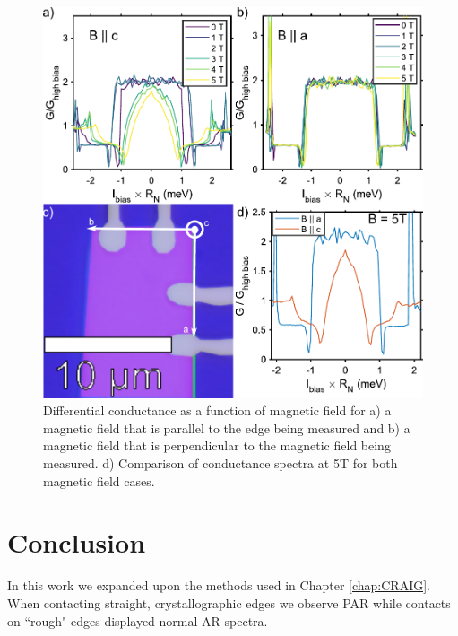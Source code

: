 \begin{figure}[h]
    \centering
    \includegraphics[width = \textwidth]{Chap4/Figures/MagneticField.pdf}
    \caption{Differential conductance as a function of magnetic field for a) a magnetic field that is parallel to the edge being measured and b) a magnetic field that is perpendicular to the magnetic field being measured. d) Comparison of conductance spectra at 5T for both magnetic field cases.}
    \label{fig:PARField}
\end{figure}
\section{Conclusion}
In this work we expanded upon the methods used in Chapter \ref{chap:CRAIG}. When contacting straight, crystallographic edges we observe \acl{PAR} while contacts on ``rough" edges displayed normal \acl{AR} spectra. 